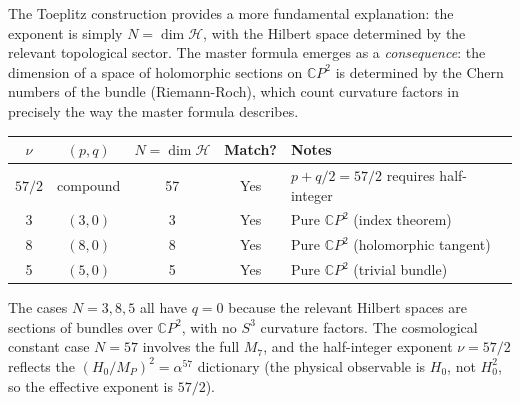 \documentclass[11pt]{article}
\theoremstyle{definition}
\theoremstyle{remark}
\newcommand{\CP}{\mathbb{C}P}
\newcommand{\Mp}{M_P}
\begin{document}
The Toeplitz construction provides a more fundamental explanation: the
exponent is simply $N = \dim \mathcal{H}$, with the Hilbert space
determined by the relevant topological sector. The master formula
emerges as a \textit{consequence}: the dimension of a space of
holomorphic sections on $\CP^2$ is determined by the Chern numbers of
the bundle (Riemann-Roch), which count curvature factors in precisely
the way the master formula describes.

\begin{center}
\renewcommand{\arraystretch}{1.3}
\begin{tabular}{ccccl}
\toprule
$\nu$ & $(p, q)$ & $N = \dim \mathcal{H}$ & Match? & \textbf{Notes} \\
\midrule
$57/2$ & compound & 57 & Yes & $p + q/2 = 57/2$ requires half-integer \\
3 & $(3,0)$ & 3 & Yes & Pure $\CP^2$ (index theorem) \\
8 & $(8,0)$ & 8 & Yes & Pure $\CP^2$ (holomorphic tangent) \\
5 & $(5,0)$ & 5 & Yes & Pure $\CP^2$ (trivial bundle) \\
\bottomrule
\end{tabular}
\end{center}

The cases $N = 3, 8, 5$ all have $q = 0$ because the relevant Hilbert
spaces are sections of bundles over $\CP^2$, with no $S^3$ curvature
factors. The cosmological constant case $N = 57$ involves the full
$M_7$, and the half-integer exponent $\nu = 57/2$ reflects the
$(H_0/\Mp)^2 = \alpha^{57}$ dictionary (the physical observable is
$H_0$, not $H_0^2$, so the effective exponent is $57/2$).
\end{document}

